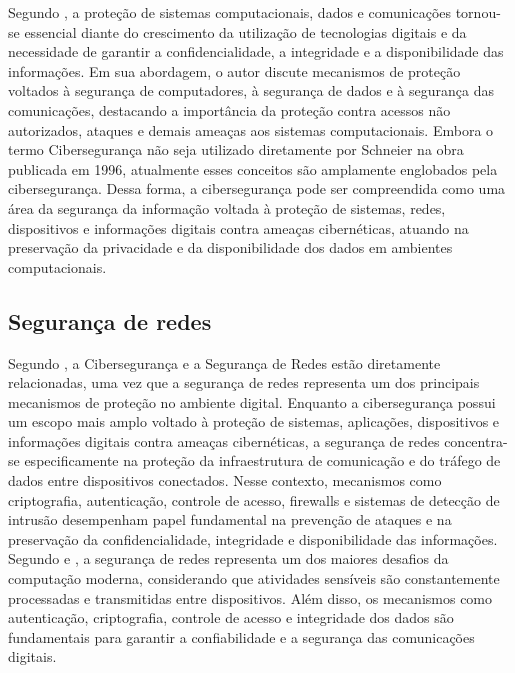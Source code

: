 \documentclass[
    12pt,                %
    openright,           %
    oneside,             %
    a4paper,             %
    english,             %
    brazil               %
]{abntex2}
\begin{document}
Segundo , a proteção de sistemas computacionais, dados e comunicações tornou-se essencial diante do crescimento da utilização de tecnologias digitais e da necessidade de garantir a confidencialidade, a integridade e a disponibilidade das informações. Em sua abordagem, o autor discute mecanismos de proteção voltados à segurança de computadores, à segurança de dados e à segurança das comunicações, destacando a importância da proteção contra acessos não autorizados, ataques e demais ameaças aos sistemas computacionais.
Embora o termo Cibersegurança não seja utilizado diretamente por Schneier na obra publicada em 1996, atualmente esses conceitos são amplamente englobados pela cibersegurança. Dessa forma, a cibersegurança pode ser compreendida como uma área da segurança da informação voltada à proteção de sistemas, redes, dispositivos e informações digitais contra ameaças cibernéticas, atuando na preservação da privacidade e da disponibilidade dos dados em ambientes computacionais.


\subsection{Segurança de redes}

Segundo , a Cibersegurança e a Segurança de Redes estão diretamente relacionadas, uma vez que a segurança de redes representa um dos principais mecanismos de proteção no ambiente digital. Enquanto a cibersegurança possui um escopo mais amplo voltado à proteção de sistemas, aplicações, dispositivos e informações digitais contra ameaças cibernéticas, a segurança de redes concentra-se especificamente na proteção da infraestrutura de comunicação e do tráfego de dados entre dispositivos conectados. Nesse contexto, mecanismos como criptografia, autenticação, controle de acesso, firewalls e sistemas de detecção de intrusão desempenham papel fundamental na prevenção de ataques e na preservação da confidencialidade, integridade e disponibilidade das informações. 
Segundo  e , a segurança de redes representa um dos maiores desafios da computação moderna, considerando que atividades sensíveis são constantemente processadas e transmitidas entre dispositivos. Além disso, os mecanismos como autenticação, criptografia, controle de acesso e integridade dos dados são fundamentais para garantir a confiabilidade e a segurança das comunicações digitais.
\end{document}
